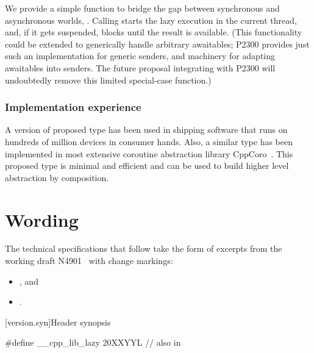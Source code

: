 We provide a simple function to bridge the gap between synchronous and asynchronous worlds, . Calling  starts the lazy execution in the current thread, and, if it gets suspended, blocks until the result is available.
(This functionality could be extended to generically handle arbitrary awaitables;
P2300 provides just such an implementation for generic senders,
and machinery for adapting awaitables into senders.
The future proposal integrating  with P2300 will undoubtedly
remove this limited special-case function.)

\subsection{Implementation experience}

A version of proposed type has been used in shipping software that runs on hundreds of million devices in consumer hands. Also, a similar type has been implemented in most extensive coroutine abstraction library CppCoro~\cite{CppCoro}. This proposed type is minimal and efficient and can be used to build higher level abstraction by composition.

\chapter{Wording}

The technical specifications that follow take the form of excerpts
from the working draft N4901~\cite{N4901} with change markings:
\begin{itemize}
\item {}, and
\item {}.
\end{itemize}

\setcounter{chapter}{17}
\setcounter{section}{3}
\setcounter{subsection}{1}
[version.syn]{Header  synopsis}


\begin{codeblock}
#define __cpp_lib_lazy                          20XXYYL // also in 
\end{codeblock}


